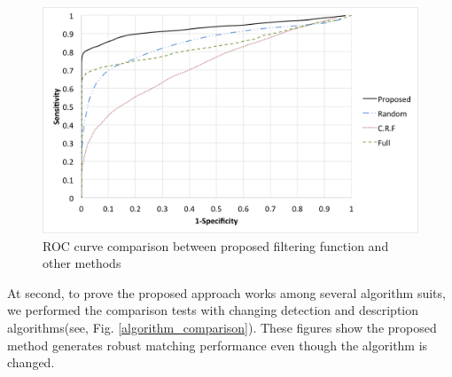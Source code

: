 \begin{figure}[ht!]
\centering
\includegraphics[width=1.0\columnwidth]{4_experiments/comparison_agast_freak}
\caption{ROC curve comparison between proposed filtering function and other methods}
\label{fig:comparison_agast_freak}
\end{figure}

At second, to prove the proposed approach works among several algorithm suits, we performed the comparison tests with changing detection and description algorithms(see, Fig. \ref{algorithm_comparison}). These figures show the proposed method generates robust matching performance even though the algorithm is changed.

